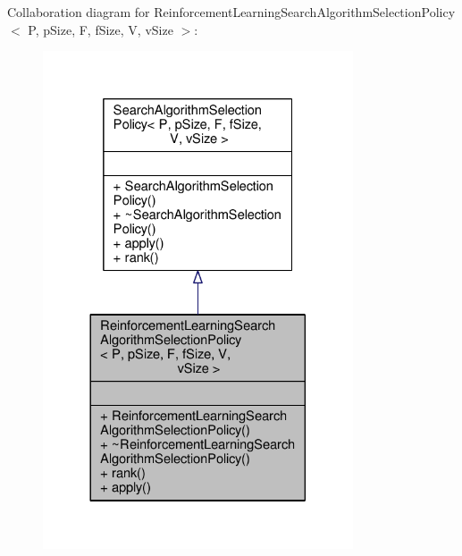 Collaboration diagram for Reinforcement\+Learning\+Search\+Algorithm\+Selection\+Policy$<$ P, p\+Size, F, f\+Size, V, v\+Size $>$\+:\nopagebreak
\begin{figure}[H]
\begin{center}
\leavevmode
\includegraphics[width=260pt]{classReinforcementLearningSearchAlgorithmSelectionPolicy__coll__graph}
\end{center}
\end{figure}
